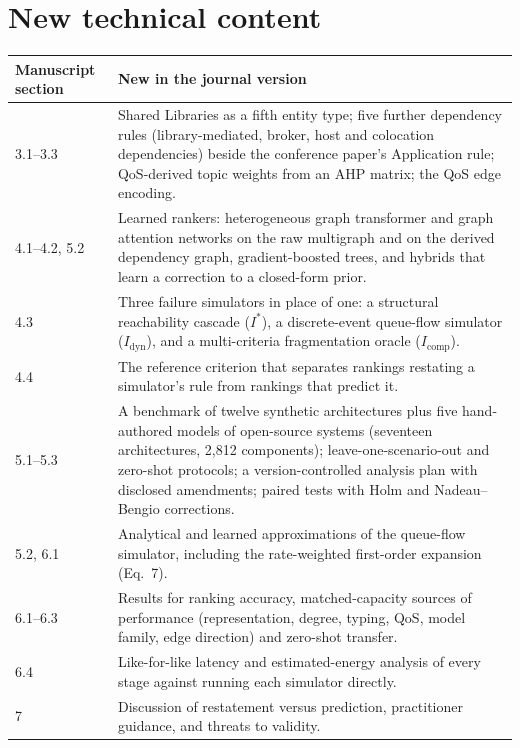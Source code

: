 \documentclass[11pt]{article}
\begin{document}
\section*{New technical content}
\begin{center}
\small
\begin{tabularx}{\linewidth}{@{}lX@{}}
\toprule
Manuscript section & New in the journal version \\
\midrule
3.1--3.3 & Shared Libraries as a fifth entity type; five further dependency rules (library-mediated, broker, host and colocation dependencies) beside the conference paper's Application rule; QoS-derived topic weights from an AHP matrix; the QoS edge encoding. \\
4.1--4.2, 5.2 & Learned rankers: heterogeneous graph transformer and graph attention networks on the raw multigraph and on the derived dependency graph, gradient-boosted trees, and hybrids that learn a correction to a closed-form prior. \\
4.3 & Three failure simulators in place of one: a structural reachability cascade ($I^*$), a discrete-event queue-flow simulator ($I_{\text{dyn}}$), and a multi-criteria fragmentation oracle ($I_{\text{comp}}$). \\
4.4 & The reference criterion that separates rankings restating a simulator's rule from rankings that predict it. \\
5.1--5.3 & A benchmark of twelve synthetic architectures plus five hand-authored models of open-source systems (seventeen architectures, 2{,}812 components); leave-one-scenario-out and zero-shot protocols; a version-controlled analysis plan with disclosed amendments; paired tests with Holm and Nadeau--Bengio corrections. \\
5.2, 6.1 & Analytical and learned approximations of the queue-flow simulator, including the rate-weighted first-order expansion (Eq.~7). \\
6.1--6.3 & Results for ranking accuracy, matched-capacity sources of performance (representation, degree, typing, QoS, model family, edge direction) and zero-shot transfer. \\
6.4 & Like-for-like latency and estimated-energy analysis of every stage against running each simulator directly. \\
7 & Discussion of restatement versus prediction, practitioner guidance, and threats to validity. \\
\bottomrule
\end{tabularx}
\end{center}
\end{document}
